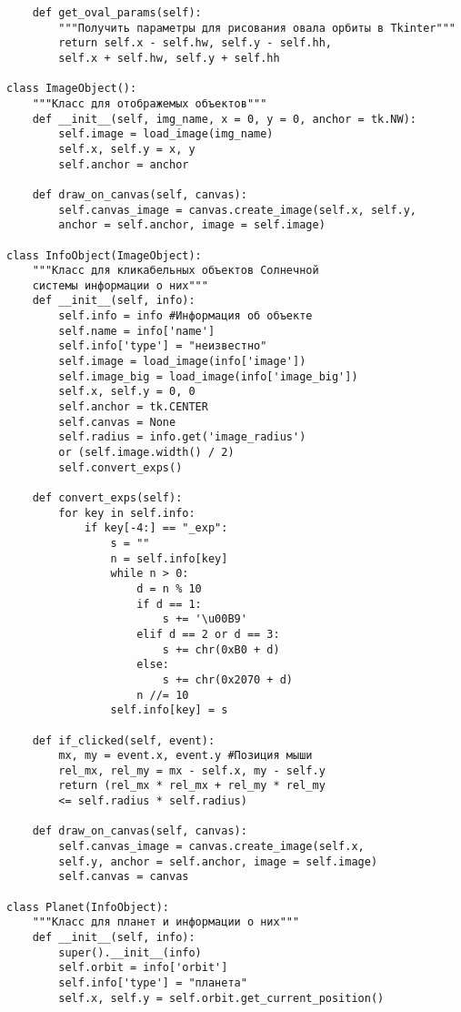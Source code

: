\documentclass[a4paper,14pt]{extarticle}
\begin{document}
\begin{verbatim}
    def get_oval_params(self):
        """Получить параметры для рисования овала орбиты в Tkinter"""
        return self.x - self.hw, self.y - self.hh, 
        self.x + self.hw, self.y + self.hh

class ImageObject():
    """Класс для отображемых объектов"""
    def __init__(self, img_name, x = 0, y = 0, anchor = tk.NW):
        self.image = load_image(img_name)
        self.x, self.y = x, y
        self.anchor = anchor
    
    def draw_on_canvas(self, canvas):
        self.canvas_image = canvas.create_image(self.x, self.y,
        anchor = self.anchor, image = self.image)

class InfoObject(ImageObject):
    """Класс для кликабельных объектов Солнечной
    системы информации о них"""
    def __init__(self, info):
        self.info = info #Информация об объекте
        self.name = info['name']
        self.info['type'] = "неизвестно"
        self.image = load_image(info['image'])
        self.image_big = load_image(info['image_big'])
        self.x, self.y = 0, 0
        self.anchor = tk.CENTER
        self.canvas = None
        self.radius = info.get('image_radius')
        or (self.image.width() / 2)
        self.convert_exps()
    
    def convert_exps(self):
        for key in self.info:
            if key[-4:] == "_exp":
                s = ""
                n = self.info[key]
                while n > 0:
                    d = n % 10
                    if d == 1:
                        s += '\u00B9'
                    elif d == 2 or d == 3:
                        s += chr(0xB0 + d)
                    else:
                        s += chr(0x2070 + d)
                    n //= 10
                self.info[key] = s
    
    def if_clicked(self, event):
        mx, my = event.x, event.y #Позиция мыши
        rel_mx, rel_my = mx - self.x, my - self.y
        return (rel_mx * rel_mx + rel_my * rel_my
        <= self.radius * self.radius)

    def draw_on_canvas(self, canvas):
        self.canvas_image = canvas.create_image(self.x,
        self.y, anchor = self.anchor, image = self.image)
        self.canvas = canvas

class Planet(InfoObject):
    """Класс для планет и информации о них"""
    def __init__(self, info):
        super().__init__(info)
        self.orbit = info['orbit']
        self.info['type'] = "планета"
        self.x, self.y = self.orbit.get_current_position()
    

\end{verbatim}
\end{document}
